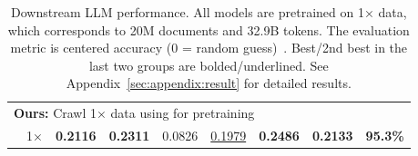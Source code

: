 \begin{table*}[t]
{\begin{tabular}{rlccccccc}
    \midrule
    
    \multicolumn{8}{l}{\textbf{Ours:} Crawl 1× data using \ours{} for pretraining} \\
    
    \rowcolor{blue! 12} 
    \ours{} & 1× & \textbf{0.2116} & \textbf{0.2311} & 0.0826 & \underline{0.1979} & \textbf{0.2486} & \textbf{0.2133} & \textbf{95.3\%}\\
    \bottomrule
  \end{tabular}
  }
  \caption{\label{tab:overall}
  Downstream LLM performance. 
  All models are pretrained on 1× data, which corresponds to 20M documents and 32.9B tokens.
  The evaluation metric is centered accuracy (0 = random guess)~\citep{dclm}.
  Best/2nd best in the last two groups are bolded/underlined.
  See Appendix~\ref{sec:appendix:result} for detailed results.
  }
\end{table*}